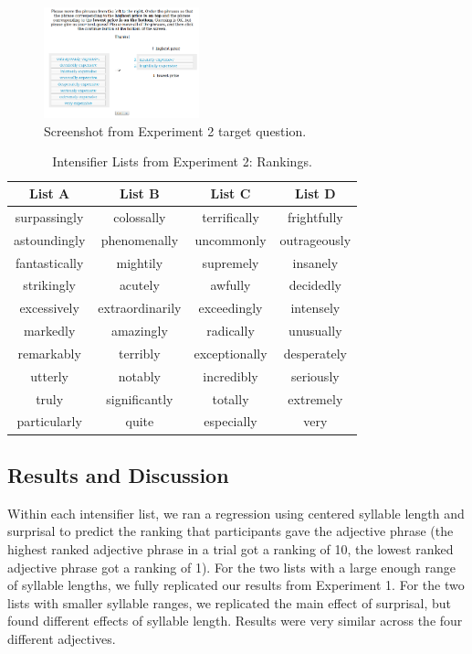 \documentclass[10pt,letterpaper]{article}
\begin{document}
\begin{figure}[ht]
\begin{center}
\includegraphics[width=0.4\textwidth]{analysis_files_for_writeup/images/exp2-q.png}
\end{center}
\caption{Screenshot from Experiment 2 target question.} 
\label{exp2-q}
\end{figure}

\begin{table}[ht]
\begin{center} 
\caption{Intensifier Lists from Experiment 2: Rankings.} 
\label{exp2-intensifiers} 
\vskip 0.12in
\begin{tabular}{cccc} 
\hline
List A    &  List B & List C & List D \\
\hline
surpassingly & colossally & terrifically & frightfully \\
astoundingly & phenomenally & uncommonly & outrageously \\
fantastically & mightily & supremely & insanely \\
strikingly & acutely & awfully & decidedly \\
excessively & extraordinarily & exceedingly & intensely \\
markedly & amazingly & radically & unusually \\
remarkably & terribly & exceptionally & desperately \\
utterly & notably & incredibly & seriously \\
truly & significantly & totally & extremely \\
particularly & quite & especially & very
\end{tabular}
\end{center}
\end{table}

\subsection{Results and Discussion}

Within each intensifier list, we ran a regression using centered syllable length and surprisal to predict the ranking that participants gave the adjective phrase (the highest ranked adjective phrase in a trial got a ranking of 10, the lowest ranked adjective phrase got a ranking of 1).
For the two lists with a large enough range of syllable lengths, we fully replicated our results from Experiment 1.
For the two lists with smaller syllable ranges, we replicated the main effect of surprisal, but found different effects of syllable length.
Results were very similar across the four different adjectives.
\end{document}

